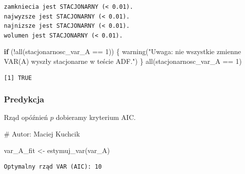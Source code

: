 \documentclass[
  polish,
  letterpaper,
  DIV=11,
  numbers=noendperiod]{scrartcl}
\newenvironment{Shaded}{\begin{snugshade}}{\end{snugshade}}
\newcommand{\CommentTok}[1]{\textcolor[rgb]{0.37,0.37,0.37}{#1}}
\newcommand{\ControlFlowTok}[1]{\textcolor[rgb]{0.00,0.23,0.31}{\textbf{#1}}}
\newcommand{\DecValTok}[1]{\textcolor[rgb]{0.68,0.00,0.00}{#1}}
\newcommand{\FunctionTok}[1]{\textcolor[rgb]{0.28,0.35,0.67}{#1}}
\newcommand{\NormalTok}[1]{\textcolor[rgb]{0.00,0.23,0.31}{#1}}
\newcommand{\OtherTok}[1]{\textcolor[rgb]{0.00,0.23,0.31}{#1}}
\newcommand{\SpecialCharTok}[1]{\textcolor[rgb]{0.37,0.37,0.37}{#1}}
\newcommand{\StringTok}[1]{\textcolor[rgb]{0.13,0.47,0.30}{#1}}
\begin{document}
\begin{verbatim}
zamkniecia jest STACJONARNY (< 0.01).
najwyzsze jest STACJONARNY (< 0.01).
najnizsze jest STACJONARNY (< 0.01).
wolumen jest STACJONARNY (< 0.01).
\end{verbatim}

\begin{Shaded}
\begin{Highlighting}[]
\ControlFlowTok{if}\NormalTok{ (}\SpecialCharTok{!}\FunctionTok{all}\NormalTok{(stacjonarnosc\_var\_A }\SpecialCharTok{==} \DecValTok{1}\NormalTok{)) \{}
  \FunctionTok{warning}\NormalTok{(}\StringTok{"Uwaga: nie wszystkie zmienne VAR(A) wyszły stacjonarne w teście ADF."}\NormalTok{)}
\NormalTok{\}}
\FunctionTok{all}\NormalTok{(stacjonarnosc\_var\_A }\SpecialCharTok{==} \DecValTok{1}\NormalTok{)}
\end{Highlighting}
\end{Shaded}

\begin{verbatim}
[1] TRUE
\end{verbatim}

\subsubsection{Predykcja}\label{predykcja}

Rząd opóźnień \(p\) dobieramy kryterium AIC.

\begin{Shaded}
\begin{Highlighting}[]
\CommentTok{\# Autor: Maciej Kuchcik}

\NormalTok{var\_A\_fit }\OtherTok{\textless{}{-}} \FunctionTok{estymuj\_var}\NormalTok{(var\_A)}
\end{Highlighting}
\end{Shaded}

\begin{verbatim}
Optymalny rząd VAR (AIC): 10 
\end{verbatim}

\begin{Shaded}
\end{Shaded}
\end{document}
